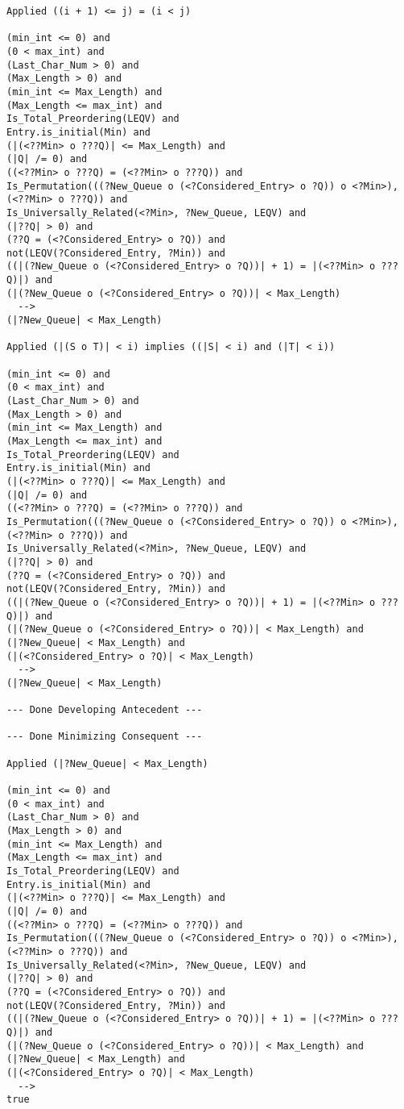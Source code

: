\begin{lstlisting}[language=resolve]
Applied ((i + 1) <= j) = (i < j)

(min_int <= 0) and
(0 < max_int) and
(Last_Char_Num > 0) and
(Max_Length > 0) and
(min_int <= Max_Length) and
(Max_Length <= max_int) and
Is_Total_Preordering(LEQV) and
Entry.is_initial(Min) and
(|(<??Min> o ???Q)| <= Max_Length) and
(|Q| /= 0) and
((<??Min> o ???Q) = (<??Min> o ???Q)) and
Is_Permutation(((?New_Queue o (<?Considered_Entry> o ?Q)) o <?Min>), (<??Min> o ???Q)) and
Is_Universally_Related(<?Min>, ?New_Queue, LEQV) and
(|??Q| > 0) and
(??Q = (<?Considered_Entry> o ?Q)) and
not(LEQV(?Considered_Entry, ?Min)) and
((|(?New_Queue o (<?Considered_Entry> o ?Q))| + 1) = |(<??Min> o ???Q)|) and
(|(?New_Queue o (<?Considered_Entry> o ?Q))| < Max_Length)
  -->
(|?New_Queue| < Max_Length)

Applied (|(S o T)| < i) implies ((|S| < i) and (|T| < i))

(min_int <= 0) and
(0 < max_int) and
(Last_Char_Num > 0) and
(Max_Length > 0) and
(min_int <= Max_Length) and
(Max_Length <= max_int) and
Is_Total_Preordering(LEQV) and
Entry.is_initial(Min) and
(|(<??Min> o ???Q)| <= Max_Length) and
(|Q| /= 0) and
((<??Min> o ???Q) = (<??Min> o ???Q)) and
Is_Permutation(((?New_Queue o (<?Considered_Entry> o ?Q)) o <?Min>), (<??Min> o ???Q)) and
Is_Universally_Related(<?Min>, ?New_Queue, LEQV) and
(|??Q| > 0) and
(??Q = (<?Considered_Entry> o ?Q)) and
not(LEQV(?Considered_Entry, ?Min)) and
((|(?New_Queue o (<?Considered_Entry> o ?Q))| + 1) = |(<??Min> o ???Q)|) and
(|(?New_Queue o (<?Considered_Entry> o ?Q))| < Max_Length) and
(|?New_Queue| < Max_Length) and
(|(<?Considered_Entry> o ?Q)| < Max_Length)
  -->
(|?New_Queue| < Max_Length)

--- Done Developing Antecedent ---

--- Done Minimizing Consequent ---

Applied (|?New_Queue| < Max_Length)

(min_int <= 0) and
(0 < max_int) and
(Last_Char_Num > 0) and
(Max_Length > 0) and
(min_int <= Max_Length) and
(Max_Length <= max_int) and
Is_Total_Preordering(LEQV) and
Entry.is_initial(Min) and
(|(<??Min> o ???Q)| <= Max_Length) and
(|Q| /= 0) and
((<??Min> o ???Q) = (<??Min> o ???Q)) and
Is_Permutation(((?New_Queue o (<?Considered_Entry> o ?Q)) o <?Min>), (<??Min> o ???Q)) and
Is_Universally_Related(<?Min>, ?New_Queue, LEQV) and
(|??Q| > 0) and
(??Q = (<?Considered_Entry> o ?Q)) and
not(LEQV(?Considered_Entry, ?Min)) and
((|(?New_Queue o (<?Considered_Entry> o ?Q))| + 1) = |(<??Min> o ???Q)|) and
(|(?New_Queue o (<?Considered_Entry> o ?Q))| < Max_Length) and
(|?New_Queue| < Max_Length) and
(|(<?Considered_Entry> o ?Q)| < Max_Length)
  -->
true


\end{lstlisting}
